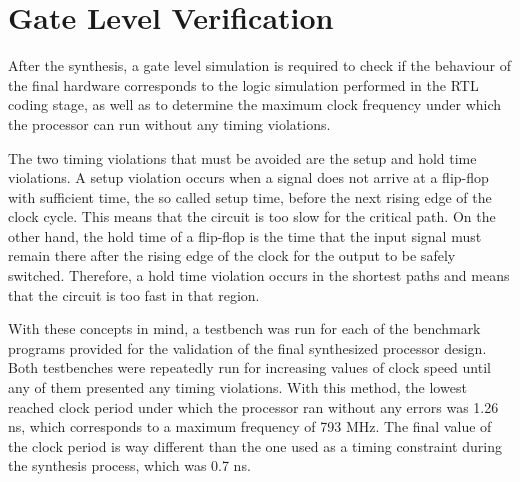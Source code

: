 \section{Gate Level Verification}
\label{sec:glverification}

After the synthesis, a gate level simulation is required to check if the behaviour of the final hardware corresponds to the logic simulation performed in the RTL coding stage, as well as to determine the maximum clock frequency under which the processor can run without any timing violations. 

The two timing violations that must be avoided are the setup and hold time violations. A setup violation occurs when a signal does not arrive at a flip-flop with sufficient time, the so called setup time, before the next rising edge of the clock cycle. This means that the circuit is too slow for the critical path. On the other hand, the hold time of a flip-flop is the time that the input signal must remain there after the rising edge of the clock for the output to be safely switched. Therefore, a hold time violation occurs in the shortest paths and means that the circuit is too fast in that region.

With these concepts in mind, a testbench was run for each of the benchmark programs provided for the validation of the final synthesized processor design. Both testbenches were repeatedly run for increasing values of clock speed until any of them presented any timing violations. With this method, the lowest reached clock period under which the processor ran without any errors was 1.26 ns, which corresponds to a maximum frequency of 793 MHz. 
The final value of the clock period is way different than the one used as a timing constraint during the synthesis process, which was 0.7 ns.